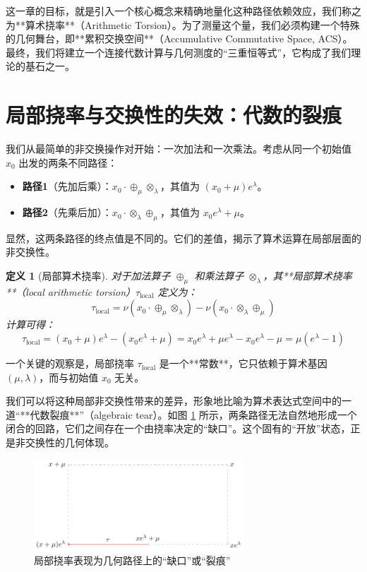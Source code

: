 \documentclass[a4paper,12pt]{book}
\numberwithin{problem}{section}
\newtheorem{definition}{定义}
\numberwithin{definition}{section}
\numberwithin{lemma}{section}
\numberwithin{proposition}{section}
\numberwithin{theorem}{section}
\numberwithin{grammar}{section}
\numberwithin{program}{section}
\numberwithin{convention}{section}
\numberwithin{corollary}{section}
\begin{document}
这一章的目标，就是引入一个核心概念来精确地量化这种路径依赖效应，我们称之为**算术挠率**（Arithmetic Torsion）。为了测量这个量，我们必须构建一个特殊的几何舞台，即**累积交换空间**（Accumulative Commutative Space, ACS）。最终，我们将建立一个连接代数计算与几何测度的“三重恒等式”，它构成了我们理论的基石之一。

\section{局部挠率与交换性的失效：代数的裂痕}
\label{sec:local_torsion}

我们从最简单的非交换操作对开始：一次加法和一次乘法。考虑从同一个初始值 $x_0$ 出发的两条不同路径：
\begin{itemize}
    \item \textbf{路径1}（先加后乘）：$x_0 \cdot \oplus_\mu \otimes_\lambda$，其值为 $(x_0+\mu)e^\lambda$。
    \item \textbf{路径2}（先乘后加）：$x_0 \cdot \otimes_\lambda \oplus_\mu$，其值为 $x_0 e^\lambda + \mu$。
\end{itemize}
显然，这两条路径的终点值是不同的。它们的差值，揭示了算术运算在局部层面的非交换性。

\begin{definition}[局部算术挠率]
    \label{def:local_torsion}
    对于加法算子 $\oplus_\mu$ 和乘法算子 $\otimes_\lambda$，其**局部算术挠率**（local arithmetic torsion）$\tau_{\text{local}}$ 定义为：
    \begin{equation}
        \tau_{\text{local}} = \nu(x_0 \cdot \oplus_\mu \otimes_\lambda) - \nu(x_0 \cdot \otimes_\lambda \oplus_\mu)
        \label{eq:local_torsion}
    \end{equation}
    计算可得：
    \[
        \tau_{\text{local}} = (x_0+\mu)e^\lambda - (x_0 e^\lambda + \mu) = x_0 e^\lambda + \mu e^\lambda - x_0 e^\lambda - \mu = \mu(e^\lambda - 1)
    \]
\end{definition}
一个关键的观察是，局部挠率 $\tau_{\text{local}}$ 是一个**常数**，它只依赖于算术基因 $(\mu, \lambda)$，而与初始值 $x_0$ 无关。

我们可以将这种局部非交换性带来的差异，形象地比喻为算术表达式空间中的一道“**代数裂痕**”（algebraic tear）。如图 \ref{fig:torsion_ch4} 所示，两条路径无法自然地形成一个闭合的回路，它们之间存在一个由挠率决定的“缺口”。这个固有的“开放”状态，正是非交换性的几何体现。

\begin{figure}[ht]
    \centering
    \includegraphics[width=0.7\textwidth]{../images/torsion} %
    \caption{局部挠率表现为几何路径上的“缺口”或“裂痕”}
    \label{fig:torsion_ch4}
\end{figure}
\end{document}
